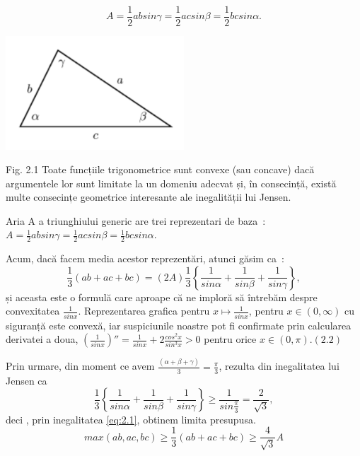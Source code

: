 \documentclass[a4paper,12pt,oneside]{report}
\begin{document}
\begin{displaymath}
  A = \frac{1}{2}ab sin\gamma = \frac{1}{2}ac sin \beta = \frac{1}{2}bc sin \alpha. 
\end{displaymath}

\begin{center}
	\includegraphics[width=0.5\textwidth]{fig2.1.png}
\end{center}

Fig. 2.1  Toate funcțiile trigonometrice sunt convexe (sau concave) dacă
argumentele lor sunt limitate la un domeniu adecvat și, în consecință,
există multe consecințe geometrice interesante ale inegalității lui Jensen.

Aria A a triunghiului generic are trei reprezentari de baza :
\(A = \frac{1}{2}ab sin\gamma = \frac{1}{2}ac sin \beta = \frac{1}{2}bc sin \alpha. \)

Acum, dacă facem media acestor reprezentări, atunci găsim ca :
\begin{displaymath}
  \frac{1}{3}\left ( ab + ac + bc \right )= \left ( 2A \right )\frac{1}{3}\left \{ \frac{1}{sin \alpha } + \frac{1}{sin \beta } + \frac{1}{sin \gamma }\right \}, \label{eq:2.1} \tag{2.1}
\end{displaymath}
și aceasta este o formulă care aproape că ne imploră să întrebăm despre convexitatea \(\frac{1}{sin x}\). Reprezentarea grafica pentru \(x \mapsto \frac{1}{sin x}\), pentru \(x\in \left ( 0 , \infty  \right )\) cu siguranță este convexă, iar suspiciunile noastre pot fi confirmate prin calcularea derivatei a doua, 
\({\left ( \frac{1}{sin x} \right )}''= \frac{1}{sin x} + 2\frac{cos^{2}x}{sin ^{3}x}> 0\) pentru orice \(x\in \left ( 0, \pi  \right ) . (2.2)\)

	Prin urmare, din moment ce avem \(\frac{\left ( \alpha + \beta  + \gamma  \right )}{3}= \frac{\pi }{3}\), rezulta din inegalitatea lui Jensen ca 
\begin{displaymath}
  \frac{1}{3}\left \{ \frac{1}{sin \alpha }  + \frac{1}{sin \beta } + \frac{1}{sin \gamma }\right \}\geq \frac{1}{sin \frac{\pi }{3}} =  \frac{2}{\sqrt{3}}, 
\end{displaymath}
deci , prin inegalitatea \ref{eq:2.1}, obtinem limita presupusa. 
\begin{displaymath}
  max \left ( ab, ac, bc \right )\geq \frac{1}{3}\left ( ab + ac + bc \right )\geq \frac{4}{\sqrt{3}}A \label{eq:2.3} \tag{2.3}
\end{displaymath}
\end{document}
